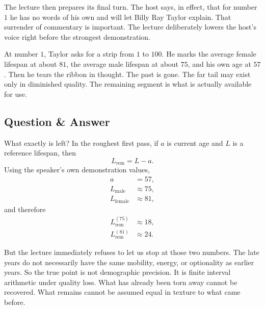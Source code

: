 The lecture then prepares its final turn. The host says, in effect, that for number \(1\) he has no words of his own and will let Billy Ray Taylor explain. That surrender of commentary is important. The lecture deliberately lowers the host's voice right before the strongest demonstration.

At number \(1\), Taylor asks for a strip from \(1\) to \(100\). He marks the average female lifespan at about \(81\), the average male lifespan at about \(75\), and his own age at \(57\). Then he tears the ribbon in thought. The past is gone. The far tail may exist only in diminished quality. The remaining segment is what is actually available for use.

\subsection{Question \& Answer}

What exactly is left? In the roughest first pass, if \(a\) is current age and \(L\) is a reference lifespan, then
\begin{equation}
L_{\mathrm{rem}} = L - a.
\end{equation}
Using the speaker's own demonstration values,
\begin{align}
a &= 57, \\
L_{\mathrm{male}} &\approx 75, \\
L_{\mathrm{female}} &\approx 81,
\end{align}
and therefore
\begin{align}
L_{\mathrm{rem}}^{(75)} &\approx 18, \\
L_{\mathrm{rem}}^{(81)} &\approx 24.
\end{align}

But the lecture immediately refuses to let us stop at those two numbers. The late years do not necessarily have the same mobility, energy, or optionality as earlier years. So the true point is not demographic precision. It is finite interval arithmetic under quality loss. What has already been torn away cannot be recovered. What remains cannot be assumed equal in texture to what came before.

\begin{figure}[h]
\centering
{}
\end{figure}

